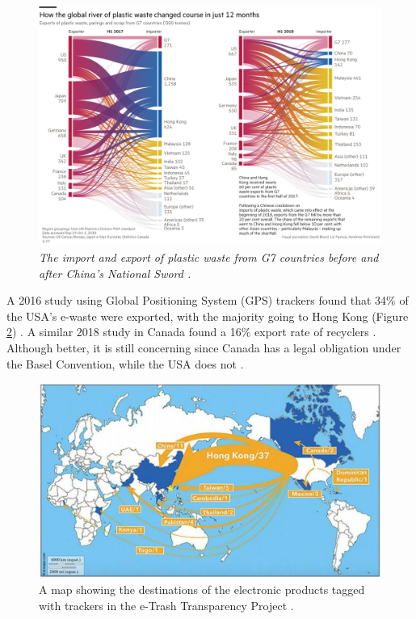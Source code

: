 \documentclass{article}
\begin{document}
\begin{figure}[h]
    \includegraphics[width=.9 \textwidth]{./images/e-waste_china_import.png}
    \centering
    \caption{\textit{The import and export of plastic waste from G7 countries before and after China's National Sword \cite{financialtimes2018nationalsword}.}}
    \label{e-waste_china_import}
\end{figure}

A 2016 study using Global Positioning System (GPS) trackers found that 34\% of the USA's e-waste were exported, with the majority going to Hong Kong (Figure \ref{US_export_e-waste}) \cite{ban2016usrecyclingexport}. A similar 2018 study in Canada found a 16\% export rate of recyclers \cite{ban2018carecyclingexport}. Although better, it is still concerning since Canada has a legal obligation under the Basel Convention, while the USA does not \cite{baselconvention2011ratify}. 

\begin{figure}[h]
    \includegraphics[width=.8 \textwidth]{./images/US_export_e-waste.png}
    \centering
    \caption{A map showing the destinations of the electronic products tagged with trackers in the e-Trash Transparency Project \cite{ban2016usrecyclingexport}.}
    \label{US_export_e-waste}
\end{figure}
\end{document}
